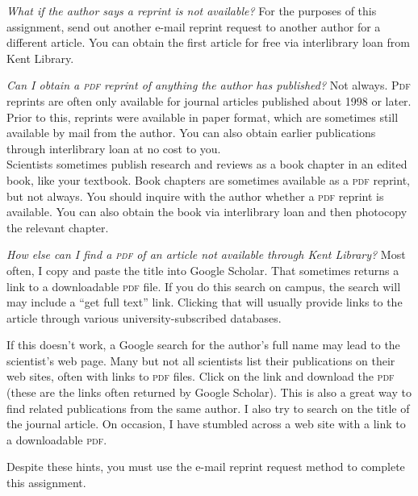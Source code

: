 \documentclass[12pt]{article}
\begin{document}
\emph{What if the author says a reprint is not available?} For the
purposes of this assignment, send out another e-mail reprint request to
another author for a different article. You can obtain the first article
for free via interlibrary loan from Kent Library.\vspace*{\baselineskip}

\emph{Can I obtain a \textsc{pdf} reprint of anything the author has
published?} Not always. P\textsc{df} reprints are often only available for
journal articles published about 1998 or later. Prior to this, reprints
were available in paper format, which are sometimes still
available by mail from the author. You can also obtain earlier publications
through interlibrary loan at no cost to you.\\ \indent
Scientists sometimes publish research and reviews as a book chapter in an
edited book, like your textbook. Book chapters are sometimes available as a \textsc{pdf} reprint, but
not always. You should inquire with the author whether a \textsc{pdf} reprint is
available. You can also obtain the book via interlibrary loan and then
photocopy the relevant chapter.\vspace*{\baselineskip}

\emph{How else can I find a \textsc{pdf} of an article not available through
Kent Library?} Most often, I copy and paste the title into Google
Scholar. That sometimes returns a link to a downloadable \textsc{pdf} file. If you do this
search on campus, the search will may include a ``get full text'' link. Clicking that will usually provide links to the article through various university-subscribed databases.

If
this doesn't work, a Google search for the author's full name
 may lead to the scientist's web page. Many but not all
scientists list their publications on their web sites, often with links
to \textsc{pdf} files. Click on the link and download the \textsc{pdf} (these are the
links often returned by Google Scholar). This is also a great way to
find related publications from the same author. I also try to search on
the title of the journal article. On occasion, I have stumbled across a
web site with a link to a downloadable \textsc{pdf}.\vspace{\baselineskip}

Despite these hints, you must use the e-mail reprint request method to
complete this assignment.
\end{document}
